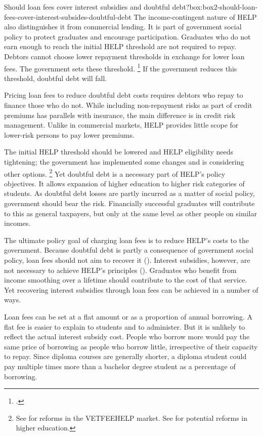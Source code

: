 \documentclass[embargoed]{grattan}
\begin{document}
\begin{bigbox*}{Should loan fees cover interest subsidies and doubtful debt?}{box:box2-should-loan-fees-cover-interest-subsides-doubtful-debt}
The income-contingent nature of \gls{HELP} also distinguishes it from commercial lending.
It is part of government social policy to protect graduates and encourage participation.
Graduates who do not earn enough to reach the initial \gls{HELP} threshold are not required to repay.
Debtors cannot choose lower repayment thresholds in exchange for lower loan fees.
The government sets these threshold.%
\footnote{\textcite[][Figure~16]{Norton2014Doubtfuldebtrising}.} 
If the government reduces this threshold, doubtful debt will fall.

Pricing loan fees to reduce doubtful debt costs requires debtors who repay to finance those who do not.
While including non-repayment risks as part of credit premiums has parallels with insurance, the main difference is in credit risk management.
Unlike in commercial markets, \gls{HELP} provides little scope for lower-risk persons to pay lower premiums.

The initial \gls{HELP} threshold should be lowered and \gls{HELP} eligibility needs tightening; the government has implemented some changes and is considering other options.%
\footnote{See \textcites{Ryan2016RedesigningVETFEE}{Birmingham2016MediareleaseNew} for reforms in the \gls{VETFEEHELP} market. See \textcite{Education2016DrivingInnovationFairness} for potential reforms in higher education.} 
Yet doubtful debt is a necessary part of \gls{HELP}'s policy objectives.
It allows expansion of higher education to higher risk categories of students.
As doubtful debt losses are partly incurred as a matter of social policy, government should bear the risk.
Financially successful graduates will contribute to this as general taxpayers, but only at the same level as other people on similar incomes.
\end{bigbox*}

The ultimate policy goal of charging loan fees is to reduce \gls{HELP}'s costs to the government.
Because doubtful debt is partly a consequence of government social policy, loan fees should not aim to recover it ().
Interest subsidies, however, are not necessary to achieve \gls{HELP}'s principles ().
Graduates who benefit from income smoothing over a lifetime should contribute to the cost of that service.
Yet recovering interest subsidies through loan fees can be achieved in a number of ways.

Loan fees can be set at a flat amount or as a proportion of annual borrowing.
A flat fee is easier to explain to students and to administer.
But it is unlikely to reflect the actual interest subsidy cost.
People who borrow more would pay the same price of borrowing as people who borrow little, irrespective of their capacity to repay.
Since diploma courses are generally shorter, a diploma student could pay multiple times more than a bachelor degree student as a percentage of borrowing.
\end{document}
